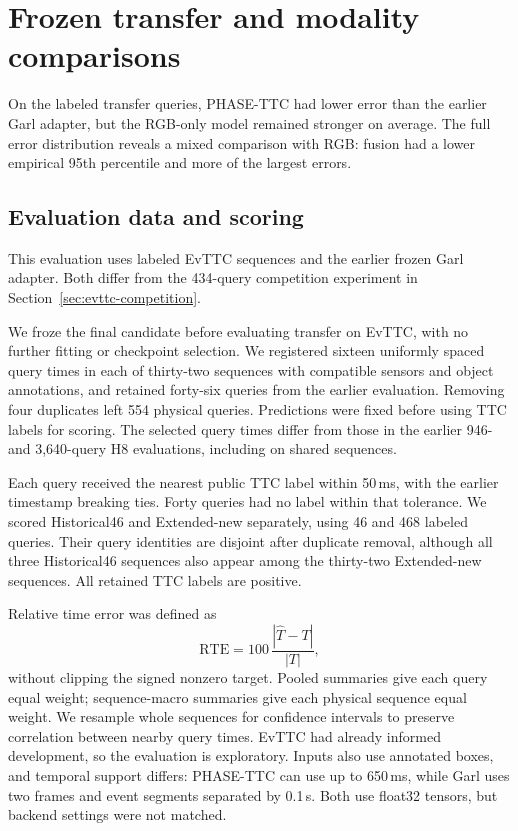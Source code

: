 \section{Frozen transfer and modality comparisons}
\label{sec:late-transfer}

On the labeled transfer queries, PHASE-TTC had lower error than the earlier Garl adapter, but the RGB-only model remained stronger on average. The full error distribution reveals a mixed comparison with RGB: fusion had a lower empirical 95th percentile and more of the largest errors.

\subsection{Evaluation data and scoring}

This evaluation uses labeled EvTTC sequences and the earlier frozen Garl adapter.
Both differ from the 434-query competition experiment in
Section~\ref{sec:evttc-competition}.

We froze the final candidate before evaluating transfer on EvTTC, with no further fitting or checkpoint selection. We registered sixteen uniformly spaced query times in each of thirty-two sequences with compatible sensors and object annotations, and retained forty-six queries from the earlier evaluation. Removing four duplicates left 554 physical queries. Predictions were fixed before using TTC labels for scoring. The selected query times differ from those in the earlier 946- and 3,640-query H8 evaluations, including on shared sequences.

Each query received the nearest public TTC label within 50\,ms, with the earlier timestamp breaking ties. Forty queries had no label within that tolerance. We scored Historical46 and Extended-new separately, using 46 and 468 labeled queries. Their query identities are disjoint after duplicate removal, although all three Historical46 sequences also appear among the thirty-two Extended-new sequences. All retained TTC labels are positive.

Relative time error was defined as
\begin{equation}
\mathrm{RTE}=100\,\frac{|\widehat T-T|}{|T|},
\end{equation}
without clipping the signed nonzero target. Pooled summaries give each query equal weight; sequence-macro summaries give each physical sequence equal weight. We resample whole sequences for confidence intervals to preserve correlation between nearby query times. EvTTC had already informed development, so the evaluation is exploratory. Inputs also use annotated boxes, and temporal support differs: PHASE-TTC can use up to 650\,ms, while Garl uses two frames and event segments separated by 0.1\,s. Both use float32 tensors, but backend settings were not matched.

